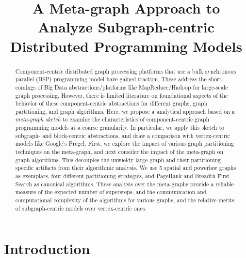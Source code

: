\documentclass[10pt,conference, compsocconf]{IEEEtran}
\begin{document}
\title{A Meta-graph Approach to Analyze Subgraph-centric Distributed Programming Models}


\author{
}


\maketitle

\begin{abstract}
Component-centric distributed graph processing platforms that use a bulk synchronous parallel (BSP) programming model have gained traction. These address the short-comings of Big Data abstractions/platforms like MapReduce/Hadoop for large-scale graph processing. However, there is limited literature on foundational aspects of the behavior of these component-centric abstractions for different graphs, graph partitioning, and graph algorithms. Here, we propose a analytical approach based on a \emph{meta-graph sketch} to examine the characteristics of component-centric graph programming models at a coarse granularity. In particular, we apply this sketch to subgraph- and block-centric abstractions, and draw a comparison with vertex-centric models like Google's Pregel. First, we explore the impact of various graph partitioning techniques on the meta-graph, and next consider the impact of the meta-graph on graph algorithms. This decouples the unwieldy large graph and their partitioning specific artifacts from their algorithmic analysis. We use 5 spatial and powerlaw graphs as exemplars, four different partitioning strategies, and PageRank and Breadth First Search as canonical algorithms. These analysis over the meta-graphs provide a reliable measure of the expected number of supersteps, and the communication and computational complexity of the algorithms for various graphs, and the relative merits of subgraph-centric models over vertex-centric ones.
\end{abstract}







\section{Introduction}\label{sec:intro}
\end{document}

